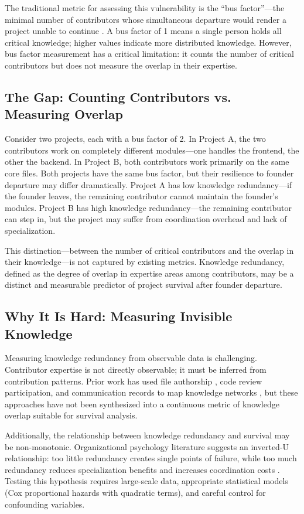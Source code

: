 \documentclass[11pt,letterpaper]{article}
\begin{document}
The traditional metric for assessing this vulnerability is the ``bus factor''---the minimal number of contributors whose simultaneous departure would render a project unable to continue \cite{Cosentino2015}. A bus factor of 1 means a single person holds all critical knowledge; higher values indicate more distributed knowledge. However, bus factor measurement has a critical limitation: it counts the number of critical contributors but does not measure the overlap in their expertise.

\subsection{The Gap: Counting Contributors vs. Measuring Overlap}

Consider two projects, each with a bus factor of 2. In Project A, the two contributors work on completely different modules---one handles the frontend, the other the backend. In Project B, both contributors work primarily on the same core files. Both projects have the same bus factor, but their resilience to founder departure may differ dramatically. Project A has low knowledge redundancy---if the founder leaves, the remaining contributor cannot maintain the founder's modules. Project B has high knowledge redundancy---the remaining contributor can step in, but the project may suffer from coordination overhead and lack of specialization.

This distinction---between the number of critical contributors and the overlap in their knowledge---is not captured by existing metrics. Knowledge redundancy, defined as the degree of overlap in expertise areas among contributors, may be a distinct and measurable predictor of project survival after founder departure.

\subsection{Why It Is Hard: Measuring Invisible Knowledge}

Measuring knowledge redundancy from observable data is challenging. Contributor expertise is not directly observable; it must be inferred from contribution patterns. Prior work has used file authorship \cite{Avelino2016}, code review participation, and communication records to map knowledge networks \cite{Linstead2017}, but these approaches have not been synthesized into a continuous metric of knowledge overlap suitable for survival analysis.

Additionally, the relationship between knowledge redundancy and survival may be non-monotonic. Organizational psychology literature suggests an inverted-U relationship: too little redundancy creates single points of failure, while too much redundancy reduces specialization benefits and increases coordination costs \cite{VanKnippenberg2007, Wang2022}. Testing this hypothesis requires large-scale data, appropriate statistical models (Cox proportional hazards with quadratic terms), and careful control for confounding variables.
\end{document}
